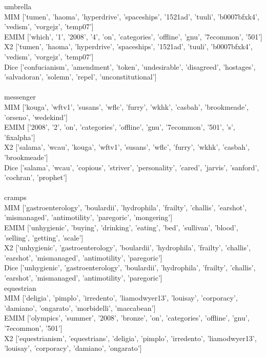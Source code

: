 \documentclass[10pt,letterpaper,bibliography=totoc]{scrartcl}
\begin{document}
\noindent
umbrella\\
  MIM  ['tumen', 'haoma', 'hyperdrive', 'spaceships', '1521ad', 'tuuli', 'b0007bfxk4', 'vedism', 'vorgejz', 'temp07']\\
  EMIM ['which', '1', '2008', '4', 'on', 'categories', 'offline', 'gnu', '7ecommon', '501']\\
  X2   ['tumen', 'haoma', 'hyperdrive', 'spaceships', '1521ad', 'tuuli', 'b0007bfxk4', 'vedism', 'vorgejz', 'temp07']\\
  Dice ['confucianism', 'amendment', 'token', 'undesirable', 'disagreed', 'hostages', 'salvadoran', 'solemn', 'repel', 'unconstitutional']\\\\
messenger\\
  MIM  ['kouga', 'wftv1', 'susans', 'wflc', 'furry', 'wkhk', 'casbah', 'brookmeade', 'orseno', 'wedekind']\\
  EMIM ['2008', '2', 'on', 'categories', 'offline', 'gnu', '7ecommon', '501', 's', 'fixalpha']\\
  X2   ['salama', 'wcau', 'kouga', 'wftv1', 'susans', 'wflc', 'furry', 'wkhk', 'casbah', 'brookmeade']\\
  Dice ['salama', 'wcau', 'copious', 'striver', 'personality', 'cared', 'jarvis', 'sanford', 'cochran', 'prophet']\\\\
cramps\\
  MIM  ['gastroenterology', 'boulardii', 'hydrophila', 'frailty', 'challis', 'earshot', 'mismanaged', 'antimotility', 'paregoric', 'mongering']\\
  EMIM ['unhygienic', 'buying', 'drinking', 'eating', 'bed', 'sullivan', 'blood', 'selling', 'getting', 'scale']\\
  X2   ['unhygienic', 'gastroenterology', 'boulardii', 'hydrophila', 'frailty', 'challis', 'earshot', 'mismanaged', 'antimotility', 'paregoric']\\
  Dice ['unhygienic', 'gastroenterology', 'boulardii', 'hydrophila', 'frailty', 'challis', 'earshot', 'mismanaged', 'antimotility', 'paregoric']\\
equestrian\\
  MIM  ['deligia', 'pimplo', 'irredento', 'liamodwyer13', 'louisay', 'corporacy', 'damiano', 'ongarato', 'morbidelli', 'maccabean']\\
  EMIM ['olympics', 'summer', '2008', 'bronze', 'on', 'categories', 'offline', 'gnu', '7ecommon', '501']\\
  X2   ['equestrianism', 'equestrians', 'deligia', 'pimplo', 'irredento', 'liamodwyer13', 'louisay', 'corporacy', 'damiano', 'ongarato']\\
\end{document}

